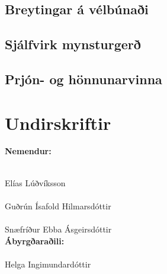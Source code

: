 \documentclass[a4paper,12pt,twoside]{article}
\begin{document}
\subsection{Breytingar á vélbúnaði}

\subsection{Sjálfvirk mynsturgerð}

\subsection{Prjón- og hönnunarvinna}


\newpage
\printbibliography

\appendix
\section{Undirskriftir}
\begin{center}
\vfill

\textbf{Nemendur:}
\vspace{2cm}

\underline{\hspace{7cm}} \\
Elías Lúðvíksson \\[1.1cm]

\underline{\hspace{7cm}} \\
Guðrún Ísafold Hilmarsdóttir \\[1.1cm]

\underline{\hspace{7cm}} \\
Snæfríður Ebba Ásgeirsdóttir \\[1.1cm]

\vfill
\textbf{Ábyrgðaraðili:} \\[1.1cm]
\underline{\hspace{7cm}} \\
Helga Ingimundardóttir

\end{center}
\end{document}
